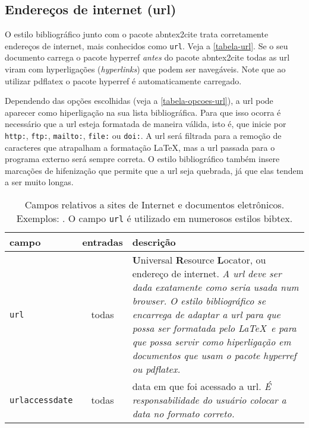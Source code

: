 \documentclass[a4paper]{ltxdoc}
\begin{document}
\subsection{Endereços de internet (url)}\label{sec-url}

O estilo bibliográfico junto com o pacote \textsf{abntex2cite} trata
corretamente endereços de internet, mais conhecidos como \texttt{url}. Veja a
\autoref{tabela-url}. Se o seu documento carrega o pacote \textsf{hyperref}
\emph{antes} do pacote \textsf{abntex2cite} todas as url viram com hyperligações
(\emph{hyperlinks}) que podem ser navegáveis. Note que ao utilizar
\textsf{pdflatex} o pacote \textsf{hyperref} é automaticamente carregado.

Dependendo das opções escolhidas (veja a \autoref{tabela-opcoes-url}),
a url pode aparecer como hiperligação na sua lista bibliográfica. Para que isso
ocorra é necessário que a url esteja formatada de maneira válida, isto é, que inicie por
\texttt{http:}, \texttt{ftp:}, \texttt{mailto:}, \texttt{file:} ou \texttt{doi:}. A url será
filtrada para a remoção de caracteres que atrapalham a formatação \LaTeX, mas a
url passada para o programa externo será sempre correta. O estilo bibliográfico
também insere marcações de hifenização que permite que a url seja quebrada, já
que elas tendem a ser muito longas.

\begin{table}[htbp]
\caption[Campos relativos a sites de Internet e documentos eletrônicos]%
{Campos relativos a sites de Internet e documentos eletrônicos.
Exemplos: .
O campo \texttt{url} é utilizado em numerosos estilos \textsf{bibtex}.}
\label{tabela-url}

\begin{center}
\begin{tabular}{lcp{8cm}}
	\toprule
campo & entradas & descrição \\ \midrule
\texttt{url}   & todas    & \textbf{U}niversal \textbf{R}esource \textbf{L}ocator, ou endereço
de internet. \emph{A url deve ser dada exatamente como seria usada num browser.
O estilo bibliográfico se encarrega de adaptar a url para que possa ser formatada
pelo \LaTeX~e para que possa servir como hiperligação em documentos que usam o
pacote \textsf{hyperref} ou \textsf{pdflatex}.}
\\ \midrule
\texttt{urlaccessdate} & todas & data em que foi acessado a url.
\emph{É responsabilidade
do usuário colocar a data no formato correto.}
\\
\bottomrule
\end{tabular}
\end{center}
\end{table}
\end{document}
